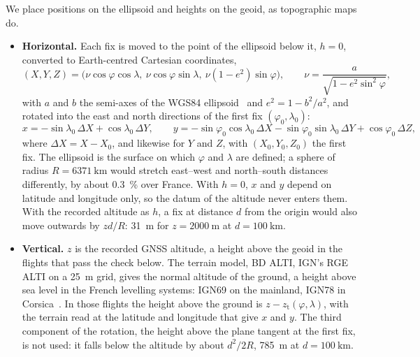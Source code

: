 We place positions on the ellipsoid and heights on the geoid, as topographic maps do.
\begin{itemize}
\item \textbf{Horizontal.} Each fix is moved to the point of the ellipsoid below it,
  $h=0$, converted to Earth-centred Cartesian coordinates,
  \begin{equation}
    (X,Y,Z)=\bigl(\nu\cos\varphi\cos\lambda,\ \nu\cos\varphi\sin\lambda,\
    \nu(1-e^2)\sin\varphi\bigr),
    \qquad \nu=\frac{a}{\sqrt{1-e^2\sin^2\varphi}},
    \label{eq:ecef}
  \end{equation}
  with $a$ and $b$ the semi-axes of the WGS84 ellipsoid~\cite{fai_igc_spec} and
  $e^2=1-b^2/a^2$, and rotated into the east and north directions of the first fix
  $(\varphi_0,\lambda_0)$:
  \begin{equation}
    x=-\sin\lambda_0\,\Delta X+\cos\lambda_0\,\Delta Y,
    \qquad
    y=-\sin\varphi_0\cos\lambda_0\,\Delta X-\sin\varphi_0\sin\lambda_0\,\Delta Y
      +\cos\varphi_0\,\Delta Z,
    \label{eq:enu}
  \end{equation}
  where $\Delta X=X-X_0$, and likewise for $Y$ and $Z$, with $(X_0,Y_0,Z_0)$ the first
  fix. The ellipsoid is the surface on which $\varphi$ and $\lambda$ are defined; a sphere
  of radius $R=\SI{6371}{\kilo\metre}$ would stretch east--west and north--south
  distances differently, by about \SI{0.3}{\percent} over France. With $h=0$, $x$ and $y$
  depend on latitude and longitude only, so the datum of the altitude never enters them.
  With the recorded altitude as $h$, a fix at distance $d$ from the origin would also
  move outwards by $zd/R$: \SI{31}{\metre} for $z=\SI{2000}{\metre}$ at
  $d=\SI{100}{\kilo\metre}$.
\item \textbf{Vertical.} $z$ is the recorded GNSS altitude, a height above the geoid in
  the flights that pass the check below. The terrain model, BD ALTI, IGN's RGE ALTI on a
  \SI{25}{\metre} grid, gives the normal altitude of the ground, a height above sea level
  in the French levelling systems: IGN69 on the mainland, IGN78 in
  Corsica~\cite{ign_bdalti}. In those flights the height above the ground is $z-z_{\mathrm{t}}(\varphi,\lambda)$, with the terrain read at the latitude
  and longitude that give $x$ and $y$. The third component of the rotation, the height above the plane
  tangent at the first fix, is not used: it falls below the altitude by about $d^2/2R$,
  \SI{785}{\metre} at $d=\SI{100}{\kilo\metre}$.
\end{itemize}

